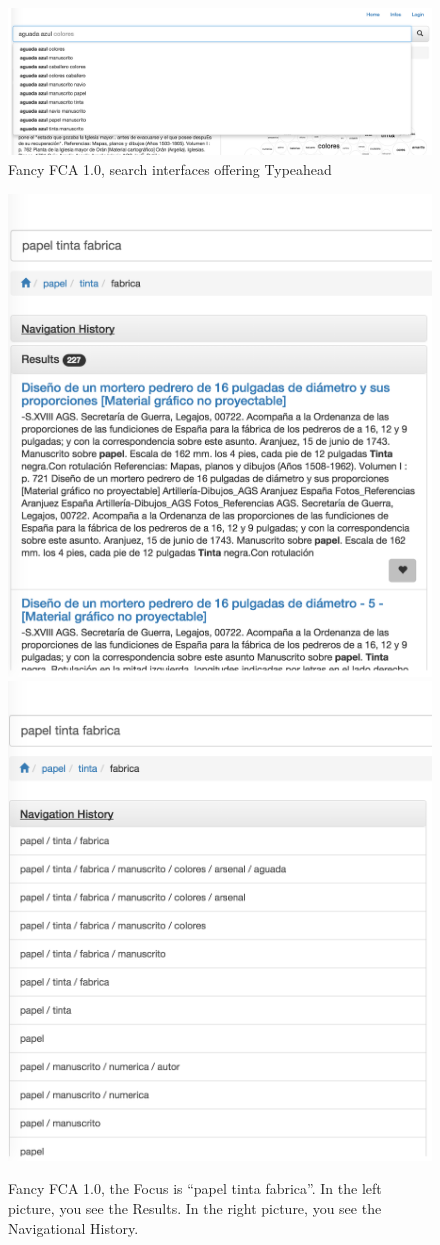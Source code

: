 \documentclass[11pt]{report}
\begin{document}
\begin{figure}[!ht]
	\centering
	\includegraphics[width=\linewidth]{images/fancy2}
\caption{Fancy FCA 1.0, search interfaces offering Typeahead}
\label{figure:fancy2}
\end{figure}

\begin{figure}[!ht]
\includegraphics[width=.48\linewidth]{images/fancy4}\hfill
\includegraphics[width=.48\linewidth]{images/fancy3}
\caption{Fancy FCA 1.0, the Focus is ``papel tinta fabrica''. In the left picture, you see the Results. In the right picture, you see the Navigational History.}
\label{figure:fancy3}
\end{figure}
\end{document}
